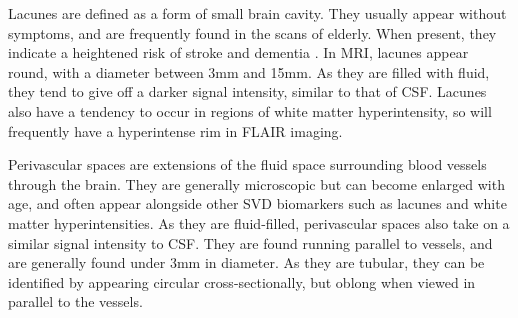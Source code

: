 \documentclass[honours,12pt]{unswthesis}
\numberwithin{equation}{section}
\begin{document}
Lacunes are defined as a form of small brain cavity. They usually appear without symptoms, and are frequently found in the scans of elderly. When present, they indicate a heightened risk of stroke and dementia \cite{VanDerFlierM.Wiesje2005SVDa, BenjaminJ.Philip2018LIbN}. In MRI, lacunes appear round, with a diameter between 3mm and 15mm. As they are filled with fluid, they tend to give off a darker signal intensity, similar to that of CSF. Lacunes also have a tendency to occur in regions of white matter hyperintensity, so will frequently have a hyperintense rim in FLAIR imaging.

Perivascular spaces are extensions of the fluid space surrounding blood vessels through the brain. They are generally microscopic but can become enlarged with age, and often appear alongside other SVD biomarkers such as lacunes and white matter hyperintensities. As they are fluid-filled, perivascular spaces also take on a similar signal intensity to CSF. They are found running parallel to vessels, and are generally found under 3mm in diameter. As they are tubular, they can be identified by appearing circular cross-sectionally, but oblong when viewed in parallel to the vessels.





\clearpage




\end{document}
